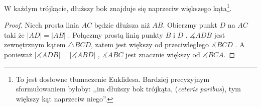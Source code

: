 \documentclass[12pt, a4paper]{scrartcl}
\begin{document}
\begin{theorem}
    W każdym trójkącie, dłuższy bok znajduje się naprzeciw większego
    kąta\footnote{
        To jest dosłowne tłumaczenie Euklidesa. Bardziej precyzyjnym
        sformułowaniem byłoby: ,,im dłuższy bok trójkąta, (\emph{ceteris
        paribus}), tym większy kąt naprzeciw niego''.
    }.

    \begin{figure}[!h]
        \begin{center}
        \end{center}
    \end{figure}

    \begin{proof}
        Niech prosta linia \(AC\) będzie dłuższa niż \(AB\). Obierzmy
        punkt \(D\) na \(AC\) taki że \(|AD| = |AB|\) . Połączmy
        prostą linią punkty \(B\) i \(D\) . \(\measuredangle ADB\) jest
        zewnętrznym kątem \(\triangle BCD\), zatem jest większy od
        przeciwległego \(\measuredangle BCD\) . A ponieważ
        \(|\measuredangle ADB| = |\measuredangle ABD|\) ,
        \(\measuredangle ABC\) jest znacznie większy od \(\measuredangle BCA\).
    \end{proof}
\end{theorem}
\end{document}
